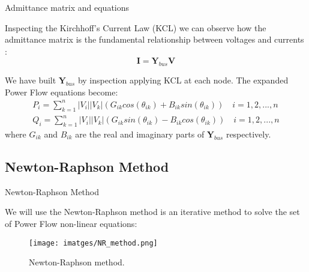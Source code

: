 \begin{frame}{Admittance matrix and equations}

Inspecting the Kirchhoff's Current Law (KCL) we can observe how the admittance matrix is the fundamental relationship between voltages and currents :
\begin{equation}
\textbf{I} = \textbf{Y}_{bus} \textbf{V}
\label{eq:kirchhoff}
\end{equation}

We have built $\textbf{Y}_{bus}$ by inspection applying KCL at each node. The expanded Power Flow equations become:
\begin{align}
    P_i= \sum_{k=1}^n|V_i||V_k|(G_{ik}cos(\theta_{ik}) + B_{ik}sin(\theta_{ik}))\label{powerflowP} \quad i= 1,2,...,n \\
    Q_i= \sum_{k=1}^n|V_i||V_k|(G_{ik}sin(\theta_{ik}) - B_{ik}cos(\theta_{ik}))\label{powerflowQ} \quad i= 1,2,...,n
\end{align}  
where $G_{ik}$ and $B_{ik}$ are the real and imaginary parts of $\textbf{Y}_{bus}$ respectively.
\end{frame}
    




\subsection{Newton-Raphson Method}

\begin{frame}{Newton-Raphson Method}

We will use the Newton-Raphson method is an iterative method to solve the set of Power Flow non-linear equations:

\begin{figure}
    \centering
    \texttt{[image: imatges/NR\_method.png]}
    \caption{Newton-Raphson method.}
    \label{fig:newton_raphson}
\end{figure}
\end{frame}
